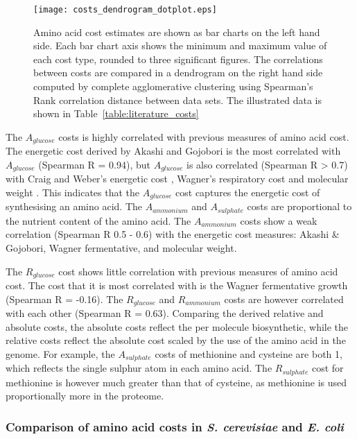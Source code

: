 \begin{sidewaysfigure}
\centering
\texttt{[image: costs\_dendrogram\_dotplot.eps]}
\caption[Comparison of amino acid cost estimates]{Amino acid cost estimates are shown as bar charts on the left hand side. Each bar chart axis shows the minimum and maximum value of each cost type, rounded to three significant figures. The correlations between costs are compared in a dendrogram on the right hand side computed by complete agglomerative clustering using Spearman's Rank correlation distance between data sets. The illustrated data is shown in Table~\vref{table:literature_costs}}
\label{figure:costs_dendrogram_dotplot}
\end{sidewaysfigure}

The $A_{glucose}$ costs is highly correlated with previous measures of amino acid cost. The energetic cost derived by Akashi and Gojobori \cite{akashi2002} is the most correlated with $A_{glucose}$ (Spearman R = 0.94), but $A_{glucose}$ is also correlated (Spearman R > 0.7) with Craig and Weber's energetic cost \cite{craig1998}, Wagner's respiratory cost \cite{wagner2005} and molecular weight \cite{seligmann2003}. This indicates that the $A_{glucose}$ cost captures the energetic cost of synthesising an amino acid. The $A_{ammonium}$ and $A_{sulphate}$ costs are proportional to the nutrient content of the amino acid. The $A_{ammonium}$ costs show a weak correlation (Spearman R 0.5 - 0.6) with the energetic cost measures: Akashi \& Gojobori, Wagner fermentative, and molecular weight.

The $R_{glucose}$ cost shows little correlation with previous measures of amino acid cost. The cost that it is most correlated with is the Wagner fermentative growth (Spearman R = -0.16). The $R_{glucose}$ and $R_{ammonium}$ costs are however correlated with each other (Spearman R = 0.63). Comparing the derived relative and absolute costs, the absolute costs reflect the per molecule biosynthetic, while the relative costs reflect the absolute cost scaled by the use of the amino acid in the genome. For example, the $A_{sulphate}$ costs of methionine and cysteine are both 1, which reflects the single sulphur atom in each amino acid. The $R_{sulphate}$ cost for methionine is however much greater than that of cysteine, as methionine is used proportionally more in the proteome.

\subsubsection{Comparison of amino acid costs in \emph{S. cerevisiae} and \emph{E. coli}}

